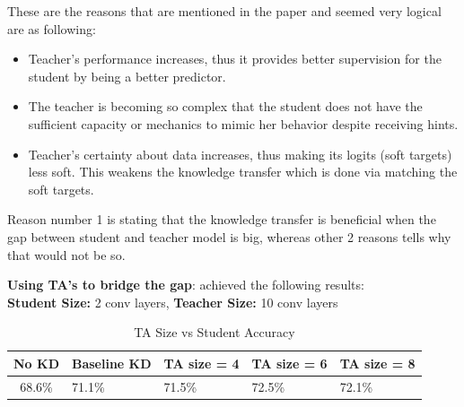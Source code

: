\documentclass{article} %
\begin{document}
	These are the reasons that are mentioned in the paper\cite{assistant} and seemed very logical are as following:
	\begin{itemize}
		\item Teacher’s performance increases, thus it provides better supervision for the student by being a better predictor. 
		
		\item The teacher is becoming so complex that the student does not have the sufficient capacity or mechanics to mimic her behavior despite receiving hints. 
		
		\item Teacher’s certainty about data increases, thus making its logits (soft targets) less soft. This weakens the knowledge transfer which is done via matching the soft targets.
	\end{itemize}
	
	Reason number 1 is stating that the knowledge transfer is beneficial when the gap between student and teacher model is big, whereas other 2 reasons tells why that would not be so.
	
	\textbf{Using TA's to bridge the gap}: achieved the following results: \\
	\textbf{Student Size: } 2 conv layers, \textbf{Teacher Size: } 10 conv layers 
	
	\begin{table}[!htbp]
		\centering
		\caption{TA Size vs Student Accuracy}
		\label{tab:my-table}
		\begin{tabular}{@{}cllll@{}}
			\toprule
			\textbf{No KD} & \multicolumn{1}{c}{\textbf{Baseline KD}} & \multicolumn{1}{c}{\textbf{TA size = 4}} & \multicolumn{1}{c}{\textbf{TA size = 6}} & \multicolumn{1}{c}{\textbf{TA size = 8}}\\ \midrule
			68.6\%  & 71.1\%  &  71.5\%  &  72.5\%  &  72.1\%  \\ \bottomrule
		\end{tabular}
	\end{table}
	
\end{document}
